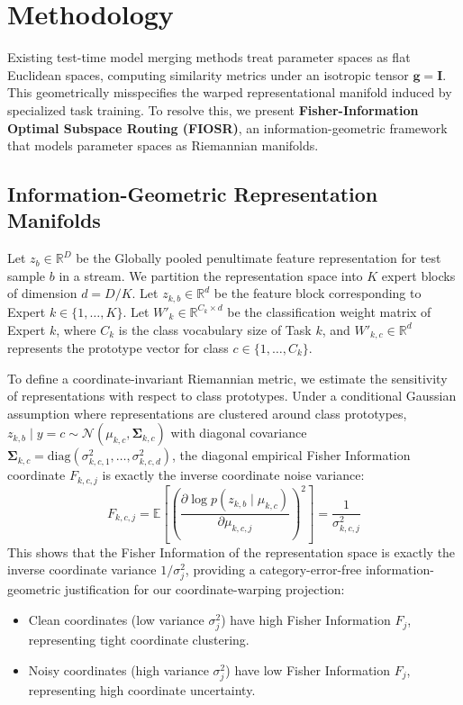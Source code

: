 \section{Methodology}
\label{sec:method}

Existing test-time model merging methods treat parameter spaces as flat Euclidean spaces, computing similarity metrics under an isotropic tensor $\mathbf{g} = \mathbf{I}$. This geometrically misspecifies the warped representational manifold induced by specialized task training. To resolve this, we present \textbf{Fisher-Information Optimal Subspace Routing (FIOSR)}, an information-geometric framework that models parameter spaces as Riemannian manifolds.

\subsection{Information-Geometric Representation Manifolds}
Let $z_b \in \mathbb{R}^D$ be the Globally pooled penultimate feature representation for test sample $b$ in a stream. We partition the representation space into $K$ expert blocks of dimension $d = D/K$. Let $z_{k, b} \in \mathbb{R}^d$ be the feature block corresponding to Expert $k \in \{1,\dots,K\}$. Let $W'_k \in \mathbb{R}^{C_k \times d}$ be the classification weight matrix of Expert $k$, where $C_k$ is the class vocabulary size of Task $k$, and $W'_{k, c} \in \mathbb{R}^d$ represents the prototype vector for class $c \in \{1,\dots,C_k\}$.

To define a coordinate-invariant Riemannian metric, we estimate the sensitivity of representations with respect to class prototypes. Under a conditional Gaussian assumption where representations are clustered around class prototypes, $z_{k, b} \mid y=c \sim \mathcal{N}(\mu_{k, c}, \mathbf{\Sigma}_{k, c})$ with diagonal covariance $\mathbf{\Sigma}_{k, c} = \text{diag}(\sigma_{k, c, 1}^2, \dots, \sigma_{k, c, d}^2)$, the diagonal empirical Fisher Information coordinate $F_{k, c, j}$ is exactly the inverse coordinate noise variance:
\begin{equation}
F_{k, c, j} = \mathbb{E} \left[ \left( \frac{\partial \log p(z_{k, b} \mid \mu_{k, c})}{\partial \mu_{k, c, j}} \right)^2 \right] = \frac{1}{\sigma_{k, c, j}^2}
\end{equation}
This shows that the Fisher Information of the representation space is exactly the inverse coordinate variance $1/\sigma_j^2$, providing a category-error-free information-geometric justification for our coordinate-warping projection:
\begin{itemize}\setlength{\itemsep}{0.5pt}\setlength{\parskip}{0pt}
    \item Clean coordinates (low variance $\sigma_j^2$) have high Fisher Information $F_j$, representing tight coordinate clustering.
    \item Noisy coordinates (high variance $\sigma_j^2$) have low Fisher Information $F_j$, representing high coordinate uncertainty.
\end{itemize}

